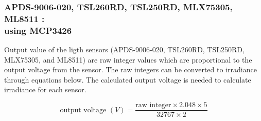 % 
% 


\subsubsection[MCP3426]{ APDS-9006-020, TSL260RD, TSL250RD, MLX75305, ML8511 : \\ using MCP3426}

Output value of the ligth sensors (APDS-9006-020, TSL260RD, TSL250RD, MLX75305, and ML8511) are raw integer values which are proportional to the output voltage from the sensor.  The raw integers can be converted to irradiance through equations below. The calculated output voltage is needed to calculate irradiance for each sensor.

\bigbreak

{\centering
 \[ \text{output voltage }(V) = \frac{\text{raw integer} \times 2.048 \times 5 }{32767 \times 2}\]
 \par
 }

% 
% 

